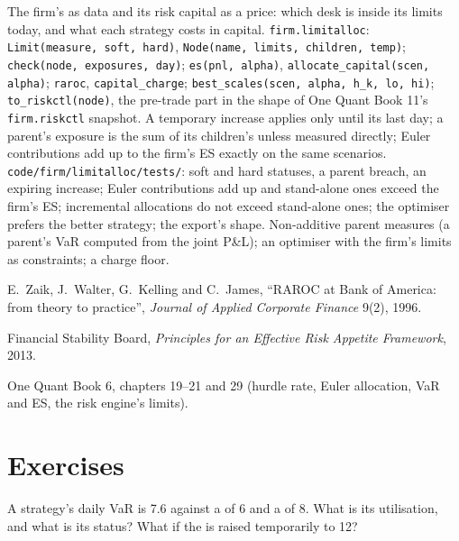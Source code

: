 \begin{build}
 The firm's  as data and its risk capital as a price: which desk is inside its limits today, and what each strategy
costs in capital.
 \texttt{firm.limitalloc}: \texttt{Limit(measure, soft, hard)}, \texttt{Node(name, limits, children, temp)};
\texttt{check(node, exposures, day)}; \texttt{es(pnl, alpha)}, \texttt{allocate\_capital(scen, alpha)}; \texttt{raroc}, \texttt{capital\_charge};
\texttt{best\_scales(scen, alpha, h\_k, lo, hi)}; \texttt{to\_riskctl(node)}, the pre-trade part in the shape of One Quant Book 11's
\texttt{firm.riskctl} snapshot.
 A temporary increase applies only until its last day; a parent's exposure is the sum of its children's unless measured directly;
Euler contributions add up to the firm's ES exactly on the same scenarios.
 \texttt{code/firm/limitalloc/tests/}: soft and hard statuses, a parent breach, an expiring increase; Euler contributions
add up and stand-alone ones exceed the firm's ES; incremental allocations do not exceed stand-alone ones; the optimiser prefers the better
strategy; the export's shape.
 Non-additive parent measures (a parent's VaR computed from the joint P\&L); an optimiser with the firm's limits as constraints;
a charge floor.
\end{build}

\begin{omsources}
\item E.~Zaik, J.~Walter, G.~Kelling and C.~James, ``RAROC at Bank of America: from theory to practice'', \emph{Journal of Applied Corporate
Finance} 9(2), 1996.
\item Financial Stability Board, \emph{Principles for an Effective Risk Appetite Framework}, 2013.
\item One Quant Book 6, chapters 19--21 and 29 (hurdle rate, Euler allocation, VaR and ES, the risk engine's limits).
\end{omsources}

\section{Exercises}

\begin{exercise}[$\star$]\label{exo:fm:limits-and-capital-allocation:1}
A strategy's daily VaR is 7.6 against a  of 6 and a  of 8. What is its utilisation, and what is its status? What if the  is raised temporarily to 12?
\end{exercise}


